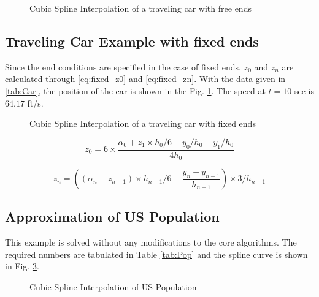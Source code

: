 \documentclass[11pt]{article}
\begin{document}
\begin{figure}
     \centering
    		 {}
     \caption{Cubic Spline Interpolation of a traveling car with free ends}
     \label{fig:Car_free}
\end{figure}

\subsection{Traveling Car Example with fixed ends}

Since the end conditions are specified in the case of fixed ends, $z_0$ and $z_n$ are calculated through \ref{eq:fixed_z0} and \ref{eq:fixed_zn}. With the data given in \ref{tab:Car}, the position of the car is shown in the Fig. \ref{fig:Car_free}. The speed at $t = 10$ sec is $64.17$ ft/s.

\begin{figure}
     \centering
    		 {}
     \caption{Cubic Spline Interpolation of a traveling car with fixed ends}
     \label{fig:Car_fixed}
\end{figure}

\begin{equation}
z_0 = 6 \times \frac{\alpha_0 + z_1\times h_0/6 + y_0/h_0 - y_1/h_0}{4h_0}
\label{eq:fixed_z0}
\end{equation}

\begin{equation}
z_n =\left ( (\alpha_n - z_{n-1})\times h_{n-1}/6 - \frac{y_{n}- y_{n-1}}{h_{n-1}}\right )\times 3/h_{n-1}
\label{eq:fixed_zn}
\end{equation}

\subsection{Approximation of US Population}

This example is solved without any modifications to the core algorithms. The required numbers are tabulated in Table \ref{tab:Pop} and the spline curve is shown in Fig. \ref{fig:Pop}.

\begin{figure}
     \centering
    		 {}
     \caption{Cubic Spline Interpolation of US Population}
     \label{fig:Pop}
\end{figure}
\end{document}
